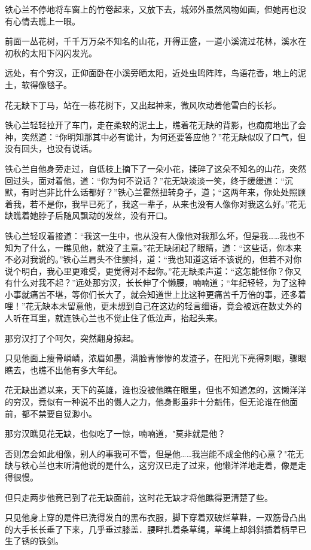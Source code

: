 \documentclass[12pt,oneside]{book}
\begin{document}
铁心兰不停地将车窗上的竹卷起来，又放下去，城郊外虽然风物如画，但她再也没有心情去瞧上一眼。

前面一丛花树，千千万万朵不知名的山花，开得正盛，一道小溪流过花林，溪水在初秋的太阳下闪闪发光。

远处，有个穷汉，正仰面卧在小溪旁晒太阳，近处虫鸣阵阵，鸟语花香，地上的泥土，软得像毯子。

花无缺下丁马，站在一栋花树下，又出起神来，微风吹动着他雪白的长衫。

铁心兰轻轻拉开了车门，走在柔软的泥土上，瞧着花无缺的背影，也痴痴地出了会神，突然道：``你明知那其中必有诡计，为何还要答应他？''花无缺似叹了口气，但没有回头，也没有说话。

铁心兰自他身旁走过，自低枝上摘下了一朵小花，揉碎了这朵不知名的山花，突然回过头，面对着他，道：``你为何不说话？''花无缺淡淡一笑，终于缓缓道：``沉默，有时岂非比什么话都好？''铁心兰霍然扭转身子，道；``这两年来，你处处照顾着我，若不是你，我早已死了，我这一辈子，从来也没有人像你对我这么好。''花无缺瞧着她脖子后随风飘动的发丝，没有开口。

铁心兰轻叹着接道：``我这一生中，也从没有人像他对我那么坏，但是我\ldots\ldots 我也不知为了什么，一瞧见他，就没了主意。''花无缺闭起了眼睛，道：``这些话，你本来不必对我说的。''铁心兰肩头不住颤抖，道：``我也知道这话不该说的，但若不对你说个明白，我心里更难受，更觉得对不起你。''花无缺柔声道：``这怎能怪你？你又有什么对我不起？''远处那穷汉，长长伸了个懒腰，喃喃道；``年纪轻轻，为了这种小事就痛苦不堪，等你们长大了，就会知道世上比这种更痛苦千万倍的事，还多着哩！''花无缺本未留意他，更未想到自己在这边的轻言细语，竟会被远在数丈外的人听在耳里，就连铁心兰也不觉止住了低泣声，抬起头来。

那穷汉打了个呵欠，突然翻身掠起。

只见他面上瘦骨嶙嶙，浓眉如墨，满脸青惨惨的发渣子，在阳光下亮得刺眼，骤眼瞧去，也瞧不出他有多大年纪。

花无缺出道以来，天下的英雄，谁也没被他瞧在眼里，但也不知道怎的，这懒洋洋的穷汉，竟似有一种说不出的慑人之力，他身影虽非十分魁伟，但无论谁在他面前，都不禁要自觉渺小。

那穷汉瞧见花无缺，也似吃了一惊，喃喃道，"莫非就是他？

否则怎会如此相像，别人的事我可不管，但是他\ldots\ldots 我岂能不成全他的心意？"花无缺与铁心兰也末听清他说的是什么，这穷汉已走了过来，他懒洋洋地走着，像是走得很慢。

但只走两步他竟已到了花无缺面前，这时花无缺才将他瞧得更清楚了些。

只见他身上穿的是件已洗得发白的黑布衣服，脚下穿着双破烂草鞋，一双筋骨凸出的大手长长垂了下来，几乎垂过膝盖．腰畔扎着条草绳，草绳上却斜斜插着柄早已生了锈的铁剑。
\end{document}
